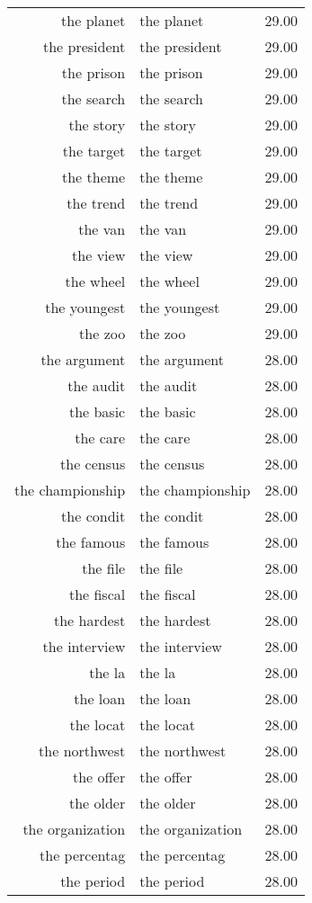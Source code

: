 \begin{table}[ht]
\begin{tabular}{rlr}
  the planet & the planet & 29.00 \\ 
  the president & the president & 29.00 \\ 
  the prison & the prison & 29.00 \\ 
  the search & the search & 29.00 \\ 
  the story & the story & 29.00 \\ 
  the target & the target & 29.00 \\ 
  the theme & the theme & 29.00 \\ 
  the trend & the trend & 29.00 \\ 
  the van & the van & 29.00 \\ 
  the view & the view & 29.00 \\ 
  the wheel & the wheel & 29.00 \\ 
  the youngest & the youngest & 29.00 \\ 
  the zoo & the zoo & 29.00 \\ 
  the argument & the argument & 28.00 \\ 
  the audit & the audit & 28.00 \\ 
  the basic & the basic & 28.00 \\ 
  the care & the care & 28.00 \\ 
  the census & the census & 28.00 \\ 
  the championship & the championship & 28.00 \\ 
  the condit & the condit & 28.00 \\ 
  the famous & the famous & 28.00 \\ 
  the file & the file & 28.00 \\ 
  the fiscal & the fiscal & 28.00 \\ 
  the hardest & the hardest & 28.00 \\ 
  the interview & the interview & 28.00 \\ 
  the la & the la & 28.00 \\ 
  the loan & the loan & 28.00 \\ 
  the locat & the locat & 28.00 \\ 
  the northwest & the northwest & 28.00 \\ 
  the offer & the offer & 28.00 \\ 
  the older & the older & 28.00 \\ 
  the organization & the organization & 28.00 \\ 
  the percentag & the percentag & 28.00 \\ 
  the period & the period & 28.00 \\ 

\end{tabular}
\end{table}
